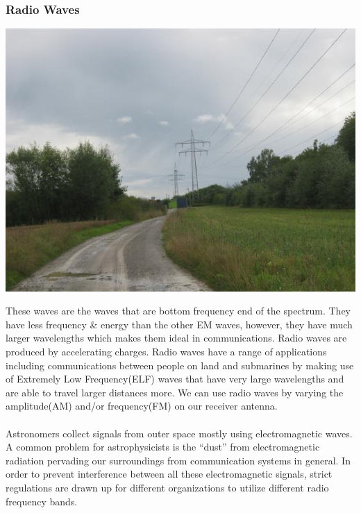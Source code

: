 \documentclass[11pt]{article}
\begin{document}
\subsubsection*{Radio Waves}
\begin{center}
	\includegraphics[scale=0.3]{radio}
\end{center}
These waves are the waves that are bottom frequency end of the spectrum. They have less frequency \& energy than the other EM waves, however, they have much larger wavelengths which makes them ideal in communications. Radio waves are produced by accelerating charges. Radio waves have a range of applications including communications between people on land and submarines by making use of Extremely Low Frequency(ELF) waves that have very large wavelengths and are able to travel larger distances more. We can use radio waves by varying the amplitude(AM) and/or frequency(FM) on our receiver antenna. \\ \\
Astronomers collect signals from outer space mostly using electromagnetic waves. A common problem for astrophysicists is the “dust” from electromagnetic radiation pervading our surroundings from communication systems in general. In order to prevent interference between all these electromagnetic signals, strict regulations are drawn up for different organizations to utilize different radio frequency bands.
\end{document}
